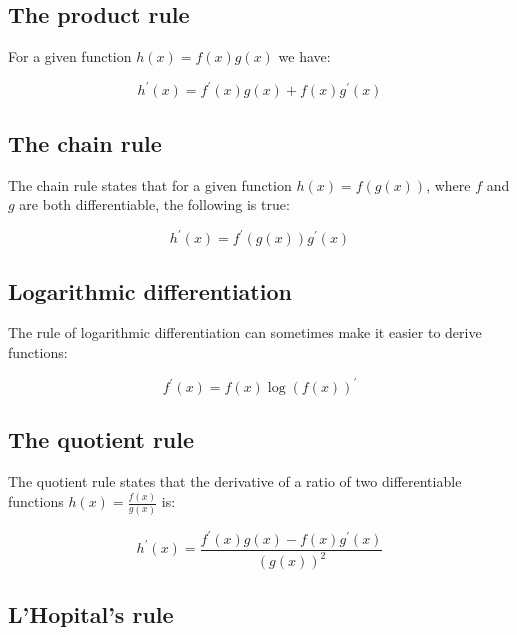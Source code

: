 \documentclass{report}
\begin{document}
\subsection{The product rule}

For a given function $h(x) = f(x)g(x)$ we have:

\begin{equation}\label{eq:product-rule}
    h^\prime(x) = f^\prime(x)g(x) + f(x)g^\prime(x)
\end{equation}

\subsection{The chain rule}

The chain rule states that for a given function $h(x) = f(g(x))$, where $f$ and $g$ are both differentiable, the following is true:

\begin{equation}\label{eq:chain-rule}
    h^\prime(x) = f^\prime(g(x))g^\prime(x)
\end{equation}

\subsection{Logarithmic differentiation}

The rule of logarithmic differentiation can sometimes make it easier to derive functions:

\begin{equation}\label{eq:logarithmic-differentiation}
    f^\prime(x) = f(x) \log(f(x))^\prime
\end{equation}

\subsection{The quotient rule}

The quotient rule states that the derivative of a ratio of two differentiable functions $h(x) = \frac{f(x)}{g(x)}$ is:

\begin{equation}\label{eq:quotient-rule}
    h^\prime(x) = \frac{f^\prime(x)g(x) - f(x)g^\prime(x)}{\left(g(x)\right)^2}
\end{equation}

\subsection{L'Hopital's rule}
\end{document}

